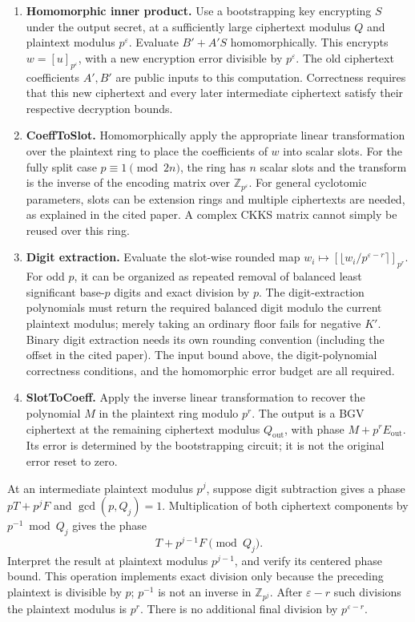 \begin{enumerate}
\item \textbf{Homomorphic inner product.} Use a bootstrapping key encrypting $S$ under the output secret, at a sufficiently large ciphertext modulus $Q$ and plaintext modulus $p^\varepsilon$. Evaluate $B'+A'S$ homomorphically. This encrypts $w=[u]_{p^\varepsilon}$, with a new encryption error divisible by $p^\varepsilon$. The old ciphertext coefficients $A',B'$ are public inputs to this computation. Correctness requires that this new ciphertext and every later intermediate ciphertext satisfy their respective decryption bounds.
\item \textbf{\textsf{CoeffToSlot}.} Homomorphically apply the appropriate linear transformation over the plaintext ring to place the coefficients of $w$ into scalar slots. For the fully split case $p\equiv1\pmod{2n}$, the ring has $n$ scalar slots and the transform is the inverse of the encoding matrix over $\mathbb Z_{p^\varepsilon}$. For general cyclotomic parameters, slots can be extension rings and multiple ciphertexts are needed, as explained in the cited paper. A complex CKKS matrix cannot simply be reused over this ring.
\item \textbf{Digit extraction.} Evaluate the slot-wise rounded map $w_i\mapsto[\lfloor w_i/p^{\varepsilon-r}\rceil]_{p^r}$. For odd $p$, it can be organized as repeated removal of balanced least significant base-$p$ digits and exact division by $p$. The digit-extraction polynomials must return the required balanced digit modulo the current plaintext modulus; merely taking an ordinary floor fails for negative $K'$. Binary digit extraction needs its own rounding convention (including the offset in the cited paper). The input bound above, the digit-polynomial correctness conditions, and the homomorphic error budget are all required.
\item \textbf{\textsf{SlotToCoeff}.} Apply the inverse linear transformation to recover the polynomial $M$ in the plaintext ring modulo $p^r$. The output is a BGV ciphertext at the remaining ciphertext modulus $Q_{\mathrm{out}}$, with phase $M+p^rE_{\mathrm{out}}$. Its error is determined by the bootstrapping circuit; it is not the original error reset to zero.
\end{enumerate}

 At an intermediate plaintext modulus $p^j$, suppose digit subtraction gives a phase $pT+p^jF$ and $\gcd(p,Q_j)=1$. Multiplication of both ciphertext components by $p^{-1}\bmod Q_j$ gives the phase
\[
T+p^{j-1}F\pmod{Q_j}.
\]
Interpret the result at plaintext modulus $p^{j-1}$, and verify its centered phase bound. This operation implements exact division only because the preceding plaintext is divisible by $p$; $p^{-1}$ is not an inverse in $\mathbb Z_{p^j}$. After $\varepsilon-r$ such divisions the plaintext modulus is $p^r$. There is no additional final division by $p^{\varepsilon-r}$.

